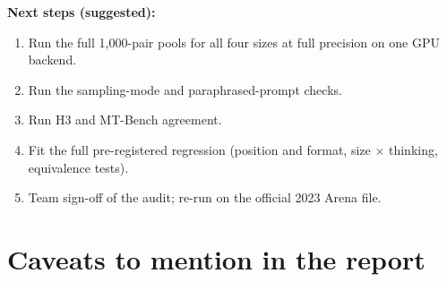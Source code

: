 \documentclass[10.5pt]{article}
\begin{document}
\textbf{Next steps (suggested):}
\begin{enumerate}
\item Run the full 1{,}000-pair pools for all four sizes at full precision on one GPU backend.
\item Run the sampling-mode and paraphrased-prompt checks.
\item Run H3 and MT-Bench agreement.
\item Fit the full pre-registered regression (position and format, size $\times$ thinking, equivalence tests).
\item Team sign-off of the audit; re-run on the official 2023 Arena file.
\end{enumerate}

\section{Caveats to mention in the report}
\end{document}
